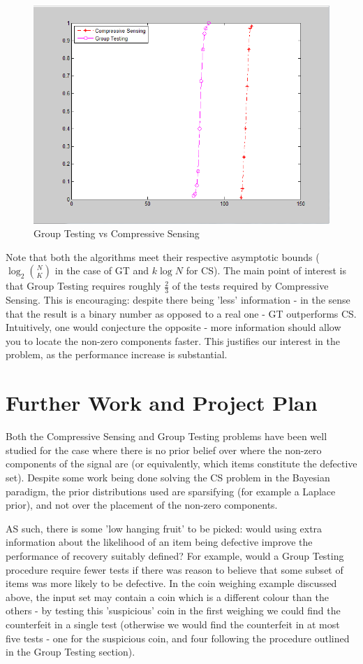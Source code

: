 \documentclass[12pt, a4paper]{article}
\begin{document}
\begin{figure}[h]
\centering
\includegraphics[height = 7 cm]{GTvsCS.png}
\caption{Group Testing vs Compressive Sensing}
\label{GTvsCS} 
\end{figure}

Note that both the algorithms meet their respective asymptotic bounds (\( \log_2{N \choose K}\) in the case of GT and \(k\log{N}\) for CS). The main point of interest is that Group Testing requires roughly \(\frac{2}{3}\) of the tests required by Compressive Sensing. This is encouraging: despite there being 'less' information - in the sense that the result is a binary number as opposed to a real one -  GT outperforms CS. Intuitively, one would conjecture the opposite - more information should allow you to locate the non-zero components faster. This justifies our interest in the problem, as the performance increase is substantial. 

\section{Further Work and Project Plan}
Both the Compressive Sensing and Group Testing problems have been well studied for the case where there is no prior belief over where the non-zero components of the signal are (or equivalently, which items constitute the defective set). Despite some work being done solving the CS problem in the Bayesian paradigm, the prior distributions used are sparsifying (for example a Laplace prior), and not over the placement of the non-zero components. 

AS such, there is some 'low hanging fruit' to be picked: would using extra information about the likelihood of an item being defective improve the performance of recovery suitably defined? For example, would a Group Testing procedure require fewer tests if there was reason to believe that some subset of items was more likely to be defective. In the coin weighing example discussed above, the input set may contain a coin which is a different colour than the others  - by testing this 'suspicious' coin in the first weighing we could find the counterfeit in a single test (otherwise we would find the counterfeit in at most five tests - one for the suspicious coin, and four following the procedure outlined in the Group Testing section). 
\end{document}
